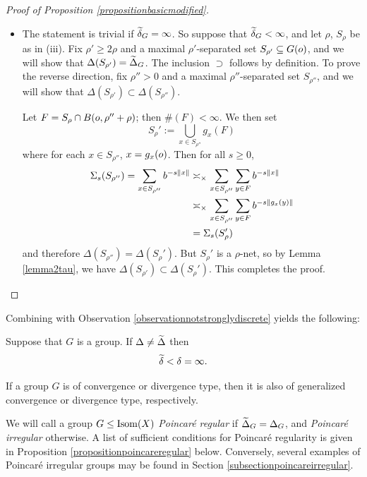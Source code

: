 \begin{proof}[Proof of Proposition \ref{propositionbasicmodified}]
\begin{itemize}
\item[(iv)] The statement is trivial if $\widetilde\delta_G = \infty$. So suppose that $\widetilde\delta_G < \infty$, and let $\rho$, $S_\rho$ be as in (iii). Fix $\rho'\geq 2\rho$ and a maximal $\rho'$-separated set $S_{\rho'}\subseteq G(o)$, and we will show that $\Delta(S_{\rho'}) = \widetilde\Delta_G$. The inclusion $\supset$ follows by definition. To prove the reverse direction, fix $\rho'' > 0$ and a maximal $\rho''$-separated set $S_{\rho''}$, and we will show that $\Delta(S_{\rho'})\subset \Delta(S_{\rho''})$.

Let $F = S_\rho\cap B(o,\rho'' + \rho)$; then $\#(F) < \infty$. We then set 
\[
S_\rho' := \bigcup_{x\in S_{\rho''}} g_x(F)
\] 
where for each $x\in S_{\rho''}$, $x = g_x(o)$. Then for all $s\geq 0$,
\begin{align*}
\Sigma_s(S_{\rho''}) = \sum_{x\in S_{\rho''}} b^{-s\|x\|} 
&\asymp_\times \sum_{x\in S_{\rho''}} \sum_{y\in F} b^{-s\|x\|}\\ 
&\asymp_\times \sum_{x\in S_{\rho''}} \sum_{y\in F} b^{-s\|g_x(y)\|}\\ 
&= \Sigma_s(S_\rho')
\end{align*}
and therefore $\Delta(S_{\rho''}) = \Delta(S_\rho')$. But $S_\rho'$ is a $\rho$-net, so by Lemma \ref{lemma2tau}, we have $\Delta(S_{\rho'}) \subset \Delta(S_\rho')$. This completes the proof.
\end{itemize}
\end{proof}

Combining with Observation \ref{observationnotstronglydiscrete} yields the following:
\begin{corollary}
\label{corollarydeltawdelta}
Suppose that $G$ is a group. If $\Delta\neq\widetilde\Delta$ then
\[
\widetilde\delta < \delta = \infty.
\]
\end{corollary}

\begin{corollary}
\label{corollarygeneralizedtypes}
If a group $G$ is of convergence or divergence type, then it is also of generalized convergence or divergence type, respectively.
\end{corollary}

We will call a group $G\leq\operatorname{Isom}(X)$ \emph{Poincar\'e regular} if $\widetilde\Delta_G = \Delta_G$, and \emph{Poincar\'e irregular} otherwise. A list of sufficient conditions for Poincar\'e regularity is given in Proposition \ref{propositionpoincareregular} below. Conversely, several examples of Poincar\'e irregular groups may be found in Section \ref{subsectionpoincareirregular}.


